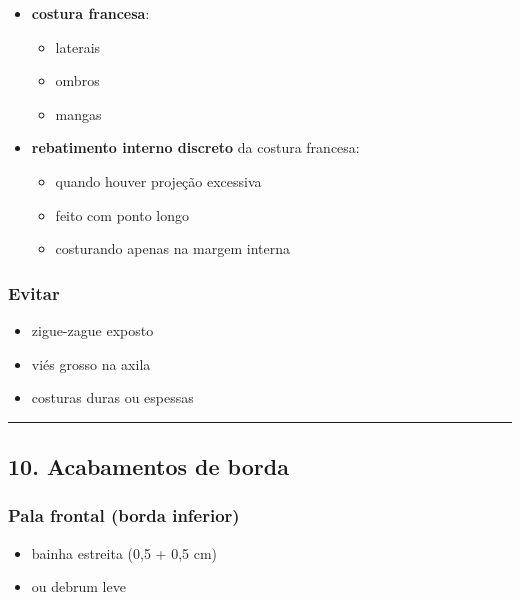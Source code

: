 \documentclass[
  10pt,oneside]{article}
\providecommand{\tightlist}{%
  \setlength{\itemsep}{0pt}\setlength{\parskip}{0pt}}
\begin{document}
\begin{itemize}
\tightlist
\item
  \textbf{costura francesa}:

  \begin{itemize}
  \tightlist
  \item
    laterais
  \item
    ombros
  \item
    mangas
  \end{itemize}
\item
  \textbf{rebatimento interno discreto} da costura francesa:

  \begin{itemize}
  \tightlist
  \item
    quando houver projeção excessiva
  \item
    feito com ponto longo
  \item
    costurando apenas na margem interna
  \end{itemize}
\end{itemize}

\subsubsection{Evitar}\label{evitar}

\begin{itemize}
\tightlist
\item
  zigue-zague exposto
\item
  viés grosso na axila
\item
  costuras duras ou espessas
\end{itemize}

\begin{center}\rule{0.5\linewidth}{0.5pt}\end{center}

\subsection{10. Acabamentos de borda}\label{acabamentos-de-borda}

\subsubsection{Pala frontal (borda inferior)}\label{pala-frontal-borda-inferior}

\begin{itemize}
\tightlist
\item
  bainha estreita (0,5 + 0,5 cm)
\item
  ou debrum leve
\end{itemize}
\end{document}
